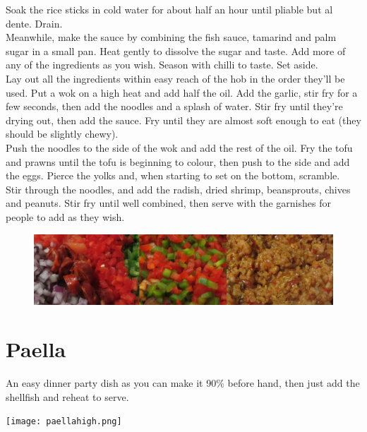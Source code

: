 \documentclass{tufte-book}
\begin{document}
\smallskip
Soak the rice sticks in cold water for about half an hour until pliable but al dente. Drain.
\\Meanwhile, make the sauce by combining the fish sauce, tamarind and palm sugar in a small pan. Heat gently to dissolve the sugar and taste. Add more of any of the ingredients as you wish. Season with chilli to taste. Set aside.
\\Lay out all the ingredients within easy reach of the hob in the order they'll be used. Put a wok on a high heat and add half the oil. Add the garlic, stir fry for a few seconds, then add the noodles and a splash of water. Stir fry until they're drying out, then add the sauce. Fry until they are almost soft enough to eat (they should be slightly chewy).
\\Push the noodles to the side of the wok and add the rest of the oil. Fry the tofu and prawns until the tofu is beginning to colour, then push to the side and add the eggs. Pierce the yolks and, when starting to set on the bottom, scramble.
\\Stir through the noodles, and add the radish, dried shrimp, beansprouts, chives and peanuts. Stir fry until well combined, then serve with the garnishes for people to add as they wish.


\begin{figure}[h]
  \includegraphics[width=\linewidth]{paella.png}
\end{figure}

\section{Paella}

An easy dinner party dish as you can make it 90\% before hand, then just add the shellfish and reheat to serve.

\begin{marginfigure}%
  \texttt{[image: paellahigh.png]}
\end{marginfigure}
\end{document}
